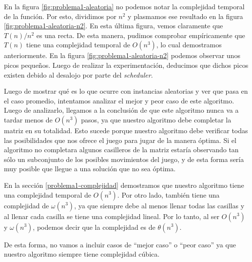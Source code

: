 En la figura \ref{fig:problema1-aleatoria} no podemos notar la complejidad temporal de la función. Por esto, dividimos por $n^2$ y plasmamos ese resultado en la figura \ref{fig:problema1-aleatoria-n2}. En esta última figura, vemos claramente que $T(n) / n ^ 2$ es una recta. De esta manera, pudimos comprobar empíricamente que $T(n)$ tiene una complejidad temporal de $O(n^3)$, lo cual demostramos anteriormente. En la figura \ref{fig:problema1-aleatoria-n2} podemos observar unos picos pequeños. Luego de realizar la experimentación, deducimos que dichos picos existen debido al desalojo por parte del \emph{scheduler}.

Luego de mostrar qué es lo que ocurre con instancias aleatorias y ver que pasa en el caso promedio, intentamos analizar el mejor y peor caso de este algoritmo. Luego de analizarlo, llegamos a la conclusión de que este algoritmo nunca va a tardar menos de $O(n^3)$ pasos, ya que nuestro algoritmo debe completar la matriz en su totalidad. Esto sucede porque nuestro algoritmo debe verificar todas las posibilidades que nos ofrece el juego para jugar de la manera óptima. Si el algoritmo no completara algunos casilleros de la matriz estaría observando tan sólo un subconjunto de los posibles movimientos del juego, y de esta forma sería muy posible que llegue a una solución que no sea óptima.

En la sección \ref{problema1-complejidad} demostramos que nuestro algoritmo tiene una complejidad temporal de $O(n^3)$. Por otro lado, también tiene una complejidad de $\omega(n^3)$, ya que siempre debe al menos llenar todas las casillas y al llenar cada casilla se tiene una complejidad lineal. Por lo tanto, al ser $O(n^3)$ y $\omega(n^3)$, podemos decir que la complejidad es de $\theta(n^3)$.

De esta forma, no vamos a incluir casos de ``mejor caso'' o ``peor caso'' ya que nuestro algoritmo siempre tiene complejidad cúbica.